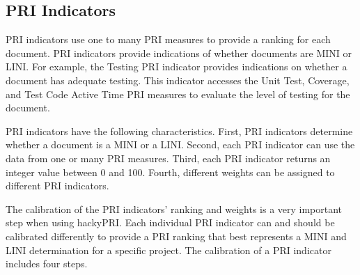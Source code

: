 \subsection{PRI Indicators}
\label{subsection:priIndicators}
PRI indicators use one to many PRI measures to provide a ranking for each
document. PRI indicators provide indications of whether documents are MINI
or LINI. For example, the Testing PRI indicator provides indications on
whether a document has adequate testing. This indicator accesses the Unit
Test, Coverage, and Test Code Active Time PRI measures to evaluate the
level of testing for the document.

PRI indicators have the following characteristics. First, PRI indicators
determine whether a document is a MINI or a LINI. Second, each PRI
indicator can use the data from one or many PRI measures. Third, each PRI
indicator returns an integer value between 0 and 100. Fourth, different
weights can be assigned to different PRI indicators.

The calibration of the PRI indicators' ranking and weights is a very
important step when using hackyPRI. Each individual PRI indicator can and
should be calibrated differently to provide a PRI ranking that best
represents a MINI and LINI determination for a specific project. The
calibration of a PRI indicator includes four steps.

